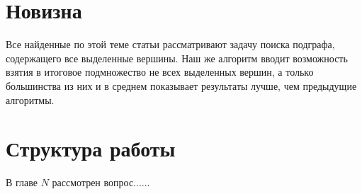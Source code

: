 

\section{Новизна}

Все найденные по этой теме статьи рассматривают задачу поиска подграфа, содержащего все выделенные вершины. Наш же алгоритм вводит возможность взятия в итоговое подмножество не всех выделенных вершин, а только большинства из них и в среднем показывает результаты лучше, чем предыдущие алгоритмы.

\section{Структура работы}

В главе $N$ рассмотрен вопрос......
